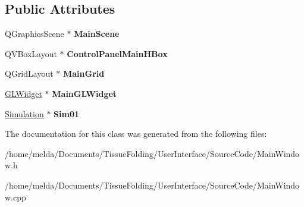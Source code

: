 \subsection*{Public Attributes}
\begin{DoxyCompactItemize}
\item 
\hypertarget{classMainWindow_a9604326eab0369c7de6be01f992e0ba7}{}Q\+Graphics\+Scene $\ast$ {\bfseries Main\+Scene}\label{classMainWindow_a9604326eab0369c7de6be01f992e0ba7}

\item 
\hypertarget{classMainWindow_a80b2787fc058a3f5141b905d6c69c0ad}{}Q\+V\+Box\+Layout $\ast$ {\bfseries Control\+Panel\+Main\+H\+Box}\label{classMainWindow_a80b2787fc058a3f5141b905d6c69c0ad}

\item 
\hypertarget{classMainWindow_a028cf99e2842ca1250d4c103310c3430}{}Q\+Grid\+Layout $\ast$ {\bfseries Main\+Grid}\label{classMainWindow_a028cf99e2842ca1250d4c103310c3430}

\item 
\hypertarget{classMainWindow_aebd88a36f5ea16df9a037f7591090856}{}\hyperlink{classGLWidget}{G\+L\+Widget} $\ast$ {\bfseries Main\+G\+L\+Widget}\label{classMainWindow_aebd88a36f5ea16df9a037f7591090856}

\item 
\hypertarget{classMainWindow_aedd252a3fb1c0e6c7fe2d9edb5d19b83}{}\hyperlink{classSimulation}{Simulation} $\ast$ {\bfseries Sim01}\label{classMainWindow_aedd252a3fb1c0e6c7fe2d9edb5d19b83}

\end{DoxyCompactItemize}


The documentation for this class was generated from the following files\+:\begin{DoxyCompactItemize}
\item 
/home/melda/\+Documents/\+Tissue\+Folding/\+User\+Interface/\+Source\+Code/Main\+Window.\+h\item 
/home/melda/\+Documents/\+Tissue\+Folding/\+User\+Interface/\+Source\+Code/Main\+Window.\+cpp\end{DoxyCompactItemize}
